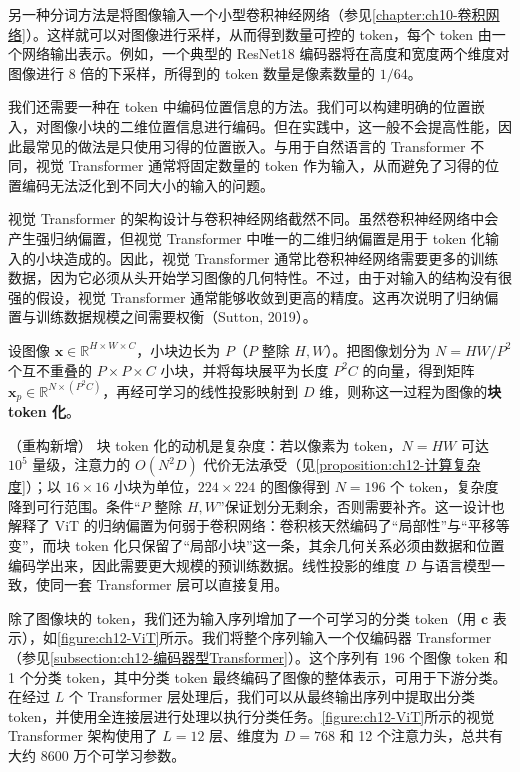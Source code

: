 \documentclass[../../main.tex]{subfiles}
\begin{document}
另一种分词方法是将图像输入一个小型卷积神经网络（参见\cref{chapter:ch10-卷积网络}）。这样就可以对图像进行采样，从而得到数量可控的 token，每个 token 由一个网络输出表示。例如，一个典型的 ResNet18 编码器将在高度和宽度两个维度对图像进行 8 倍的下采样，所得到的 token 数量是像素数量的 $1/64$。

我们还需要一种在 token 中编码位置信息的方法。我们可以构建明确的位置嵌入，对图像小块的二维位置信息进行编码。但在实践中，这一般不会提高性能，因此最常见的做法是只使用习得的位置嵌入。与用于自然语言的 Transformer 不同，视觉 Transformer 通常将固定数量的 token 作为输入，从而避免了习得的位置编码无法泛化到不同大小的输入的问题。

视觉 Transformer 的架构设计与卷积神经网络截然不同。虽然卷积神经网络中会产生强归纳偏置，但视觉 Transformer 中唯一的二维归纳偏置是用于 token 化输入的小块造成的。因此，视觉 Transformer 通常比卷积神经网络需要更多的训练数据，因为它必须从头开始学习图像的几何特性。不过，由于对输入的结构没有很强的假设，视觉 Transformer 通常能够收敛到更高的精度。这再次说明了归纳偏置与训练数据规模之间需要权衡（Sutton, 2019）。

\begin{definition}\label{definition:ch12-图像块分词}
设图像 $\mathbf{x}\in\mathbb{R}^{H\times W\times C}$，小块边长为 $P$（$P$ 整除 $H,W$）。把图像划分为 $N=HW/P^{2}$ 个互不重叠的 $P\times P\times C$ 小块，并将每块展平为长度 $P^{2}C$ 的向量，得到矩阵 $\mathbf{x}_p\in\mathbb{R}^{N\times(P^{2}C)}$，再经可学习的线性投影映射到 $D$ 维，则称这一过程为图像的\textbf{块 token 化}。
\end{definition}

\begin{remark}（重构新增）
块 token 化的动机是复杂度：若以像素为 token，$N=HW$ 可达 $10^{5}$ 量级，注意力的 $O(N^{2}D)$ 代价无法承受（见\cref{proposition:ch12-计算复杂度}）；以 $16\times16$ 小块为单位，$224\times224$ 的图像得到 $N=196$ 个 token，复杂度降到可行范围。条件“$P$ 整除 $H,W$”保证划分无剩余，否则需要补齐。这一设计也解释了 ViT 的归纳偏置为何弱于卷积网络：卷积核天然编码了“局部性”与“平移等变”，而块 token 化只保留了“局部小块”这一条，其余几何关系必须由数据和位置编码学出来，因此需要更大规模的预训练数据。线性投影的维度 $D$ 与语言模型一致，使同一套 Transformer 层可以直接复用。
\end{remark}

除了图像块的 token，我们还为输入序列增加了一个可学习的分类 token（用 $\mathbf{c}$ 表示），如\cref{figure:ch12-ViT}所示。我们将整个序列输入一个仅编码器 Transformer（参见\cref{subsection:ch12-编码器型Transformer}）。这个序列有 196 个图像 token 和 1 个分类 token，其中分类 token 最终编码了图像的整体表示，可用于下游分类。在经过 $L$ 个 Transformer 层处理后，我们可以从最终输出序列中提取出分类 token，并使用全连接层进行处理以执行分类任务。\cref{figure:ch12-ViT}所示的视觉 Transformer 架构使用了 $L=12$ 层、维度为 $D=768$ 和 12 个注意力头，总共有大约 8600 万个可学习参数。
\end{document}
